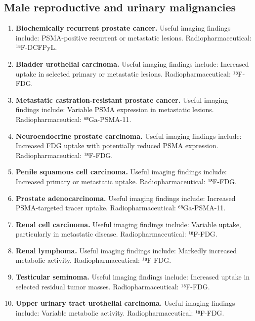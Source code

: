 \subsection{Male reproductive and urinary malignancies}
\begin{enumerate}[leftmargin=*,itemsep=0.45em,topsep=0.4em]
\item \textbf{Biochemically recurrent prostate cancer.} Useful imaging findings include: PSMA-positive recurrent or metastatic lesions. Radiopharmaceutical: ¹⁸F-DCFPyL.
\item \textbf{Bladder urothelial carcinoma.} Useful imaging findings include: Increased uptake in selected primary or metastatic lesions. Radiopharmaceutical: ¹⁸F-FDG.
\item \textbf{Metastatic castration-resistant prostate cancer.} Useful imaging findings include: Variable PSMA expression in metastatic lesions. Radiopharmaceutical: ⁶⁸Ga-PSMA-11.
\item \textbf{Neuroendocrine prostate carcinoma.} Useful imaging findings include: Increased FDG uptake with potentially reduced PSMA expression. Radiopharmaceutical: ¹⁸F-FDG.
\item \textbf{Penile squamous cell carcinoma.} Useful imaging findings include: Increased primary or metastatic uptake. Radiopharmaceutical: ¹⁸F-FDG.
\item \textbf{Prostate adenocarcinoma.} Useful imaging findings include: Increased PSMA-targeted tracer uptake. Radiopharmaceutical: ⁶⁸Ga-PSMA-11.
\item \textbf{Renal cell carcinoma.} Useful imaging findings include: Variable uptake, particularly in metastatic disease. Radiopharmaceutical: ¹⁸F-FDG.
\item \textbf{Renal lymphoma.} Useful imaging findings include: Markedly increased metabolic activity. Radiopharmaceutical: ¹⁸F-FDG.
\item \textbf{Testicular seminoma.} Useful imaging findings include: Increased uptake in selected residual tumor masses. Radiopharmaceutical: ¹⁸F-FDG.
\item \textbf{Upper urinary tract urothelial carcinoma.} Useful imaging findings include: Variable metabolic activity. Radiopharmaceutical: ¹⁸F-FDG.
\end{enumerate}

